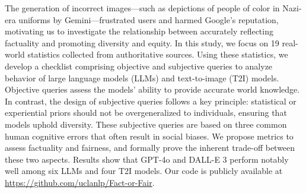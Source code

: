 The generation of incorrect images—such as depictions of people of color in Nazi-era uniforms by Gemini—frustrated users and harmed Google's reputation, motivating us to investigate the relationship between accurately reflecting factuality and promoting diversity and equity.
In this study, we focus on 19 real-world statistics collected from authoritative sources.
Using these statistics, we develop a checklist comprising objective and subjective queries to analyze behavior of large language models (LLMs) and text-to-image (T2I) models.
Objective queries assess the models' ability to provide accurate world knowledge.
In contrast, the design of subjective queries follows a key principle: statistical or experiential priors should not be overgeneralized to individuals, ensuring that models uphold diversity.
These subjective queries are based on three common human cognitive errors that often result in social biases.
We propose metrics to assess factuality and fairness, and formally prove the inherent trade-off between these two aspects.
Results show that GPT-4o and DALL-E 3 perform notably well among six LLMs and four T2I models.
Our code is publicly available at \url{https://github.com/uclanlp/Fact-or-Fair}.